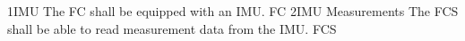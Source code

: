 \req
    {1}{IMU}
    {
        The FC shall be equipped with an IMU.
    }
    {}
    {FC}
\req
    {2}{IMU Measurements}
    {
        The FCS shall be able to read measurement data from the IMU.
    }
    {}
    {FCS}